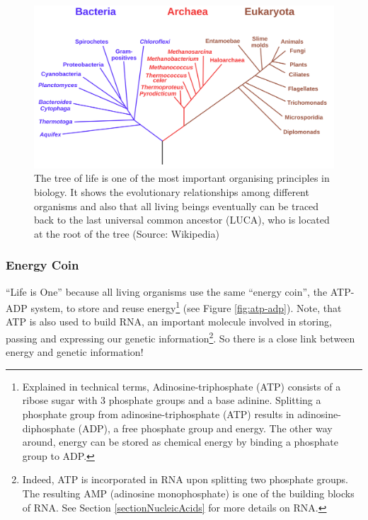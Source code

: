\documentclass[
  11pt,
]{book}
\begin{document}
\begin{figure}

{\centering \includegraphics[width=0.8\linewidth]{./figs/Phylogenetic_tree} 

}

\caption{The tree of life is one of the most important organising principles in biology. It shows the evolutionary relationships among different organisms and also that all living beings eventually can be traced back to the last universal common ancestor (LUCA), who is located at the root of the tree (Source: Wikipedia)}\label{fig:treeOfLife}
\end{figure}

\hypertarget{sectionEnergyCoin}{%
\subsubsection{Energy Coin}\label{sectionEnergyCoin}}

``Life is One'' because all living organisms use the same ``energy coin'', the ATP-ADP system, to store and reuse energy\footnote{Explained in technical terms, Adinosine-triphosphate (ATP) consists of a ribose sugar with 3 phosphate groups and a base adinine.
  Splitting a phosphate group from adinosine-triphosphate (ATP) results in adinosine-diphosphate (ADP), a free phosphate group and energy.
  The other way around, energy can be stored as chemical energy by binding a phosphate group to ADP.} (see Figure \ref{fig:atp-adp}).
Note, that ATP is also used to build RNA, an important molecule involved in storing, passing and expressing our genetic information\footnote{Indeed, ATP is incorporated in RNA upon splitting two phosphate groups. The resulting AMP (adinosine monophosphate) is one of the building blocks of RNA. See Section \ref{sectionNucleicAcids} for more details on RNA.}. So there is a close link between energy and genetic information!
\end{document}
